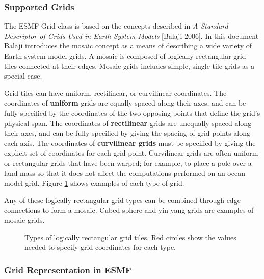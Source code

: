\subsubsection{Supported Grids}

The ESMF Grid class is based on the concepts described in {\it A Standard Descriptor 
of Grids Used in Earth System Models} [Balaji 2006].  In this document
Balaji introduces the mosaic concept as a means of describing a wide variety of
Earth system model grids.  A mosaic is composed of logically rectangular
grid tiles connected at their edges.  Mosaic grids includes simple,
single tile grids as a special case.

Grid tiles can have uniform, rectilinear, or curvilinear
coordinates.  The coordinates of {\bf uniform} grids are equally spaced along their
axes, and can be fully specified by the coordinates of the two opposing points
that define the grid's physical span.  The coordinates of {\bf rectilinear} grids
are unequally spaced along their axes, and can be fully specified by giving
the spacing of grid points along each axis.  The coordinates of {\bf curvilinear 
grids} must be specified by giving the explicit set of coordinates for each
grid point.  Curvilinear grids are often uniform or rectangular grids that 
have been warped; for example, to place a pole over a land mass so that it
does not affect the computations performed on an ocean model grid.  Figure
\ref{fig:LogRectGrids} shows examples of each type of grid.

Any of these logically rectangular grid types can be combined through edge
connections to form a mosaic.  Cubed sphere and yin-yang grids are examples
of mosaic grids.
 
\begin{figure}
\caption{Types of logically rectangular grid tiles.  Red circles show the
values needed to specify grid coordinates for each type.}
\label{fig:LogRectGrids}
\end{figure}

\subsubsection{Grid Representation in ESMF}

